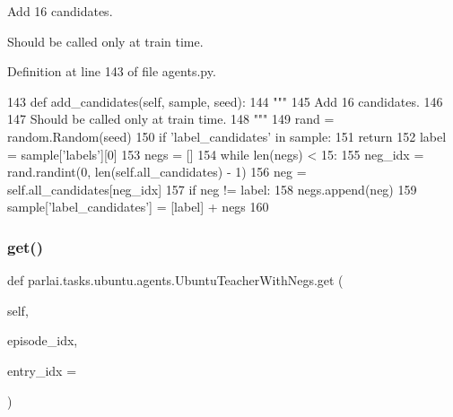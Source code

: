 \begin{DoxyVerb}Add 16 candidates.

Should be called only at train time.
\end{DoxyVerb}
 

Definition at line 143 of file agents.\+py.


\begin{DoxyCode}
143     \textcolor{keyword}{def }add\_candidates(self, sample, seed):
144         \textcolor{stringliteral}{"""}
145 \textcolor{stringliteral}{        Add 16 candidates.}
146 \textcolor{stringliteral}{}
147 \textcolor{stringliteral}{        Should be called only at train time.}
148 \textcolor{stringliteral}{        """}
149         rand = random.Random(seed)
150         \textcolor{keywordflow}{if} \textcolor{stringliteral}{'label\_candidates'} \textcolor{keywordflow}{in} sample:
151             \textcolor{keywordflow}{return}
152         label = sample[\textcolor{stringliteral}{'labels'}][0]
153         negs = []
154         \textcolor{keywordflow}{while} len(negs) < 15:
155             neg\_idx = rand.randint(0, len(self.all\_candidates) - 1)
156             neg = self.all\_candidates[neg\_idx]
157             \textcolor{keywordflow}{if} neg != label:
158                 negs.append(neg)
159         sample[\textcolor{stringliteral}{'label\_candidates'}] = [label] + negs
160 
\end{DoxyCode}
\mbox{\label{classparlai_1_1tasks_1_1ubuntu_1_1agents_1_1UbuntuTeacherWithNegs_a47304c2339835e7942ae190d4b17fc2d}} 
\subsubsection{\texorpdfstring{get()}{get()}}
{\footnotesize\ttfamily def parlai.\+tasks.\+ubuntu.\+agents.\+Ubuntu\+Teacher\+With\+Negs.\+get (\begin{DoxyParamCaption}\item[{}]{self,  }\item[{}]{episode\+\_\+idx,  }\item[{}]{entry\+\_\+idx = {} }\end{DoxyParamCaption})}



